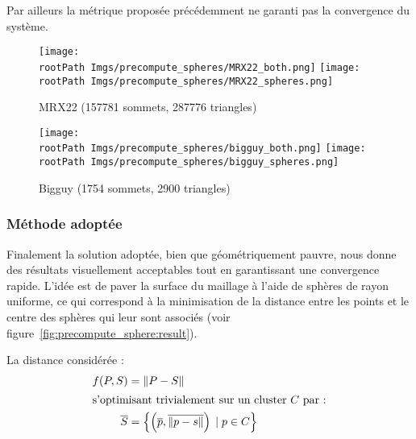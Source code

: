 \documentclass[10pt,a4paper,twoside, twocolumn]{report}
\newcommand*{\rootPath}{../}
\begin{document}
Par ailleurs la métrique proposée précédemment ne garanti pas la convergence du système.

\begin{figure*}[!ht]\centering
	\begin{subfigure}[b]{\textwidth}\centering
		\texttt{[image: \\rootPath Imgs/precompute\_spheres/MRX22\_both.png]}
		\vspace{0.5cm}
		\texttt{[image: \\rootPath Imgs/precompute\_spheres/MRX22\_spheres.png]}
		\caption{MRX22 (157781 sommets, 287776 triangles)}
	\end{subfigure}

	\begin{subfigure}[b]{\textwidth}\centering
		\texttt{[image: \\rootPath Imgs/precompute\_spheres/bigguy\_both.png]}
		\vspace{0.5cm}
		\texttt{[image: \\rootPath Imgs/precompute\_spheres/bigguy\_spheres.png]}
		\caption{Bigguy (1754 sommets, 2900 triangles)}
	\end{subfigure}
	
	\caption{Décomposition en sphères d'objets 3D ($100000$ échantillons, $100$ sphères)}
	\label{fig:precompute_sphere:result}
\end{figure*}

\subsubsection{Méthode adoptée}

Finalement la solution adoptée, bien que géométriquement pauvre, nous donne des résultats visuellement acceptables tout en garantissant une convergence rapide. L'idée est de paver la surface du maillage à l'aide de sphères de rayon uniforme, ce qui correspond à la minimisation de la distance entre les points et le centre des sphères qui leur sont associés (voir figure~\ref{fig:precompute_sphere:result}).

La distance considérée :
\begin{align}
	f(P, S)			&= \left\|P-S\right\|	\\
\intertext{s'optimisant trivialement sur un cluster $C$ par :}
	\overline S	&= \left\{ \left(\overline p, \overline{\|p-s\|}\right)\;|\;p \in C \right\}
\end{align}

\ifstandalone
	
	
\fi
\end{document}
